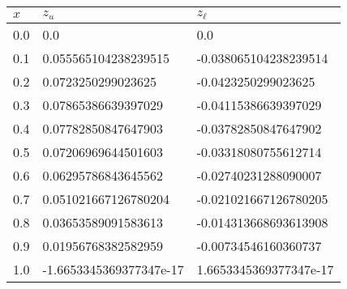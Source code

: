\documentclass{article}%
\begin{document}
\renewcommand{\arraystretch}{1.2}
\begin{tabular}{ l | l | l}
$x$ & $z_u$ & $z_\ell$\\
\hline
0.0 & 0.0 & 0.0 \\
0.1 & 0.055565104238239515 & -0.038065104238239514 \\
0.2 & 0.0723250299023625 & -0.0423250299023625 \\
0.3 & 0.07865386639397029 & -0.04115386639397029 \\
0.4 & 0.07782850847647903 & -0.03782850847647902 \\
0.5 & 0.07206969644501603 & -0.03318080755612714 \\
0.6 & 0.06295786843645562 & -0.02740231288090007 \\
0.7 & 0.051021667126780204 & -0.021021667126780205 \\
0.8 & 0.03653589091583613 & -0.014313668693613908 \\
0.9 & 0.01956768382582959 & -0.00734546160360737 \\
1.0 & -1.6653345369377347e-17 & 1.6653345369377347e-17 \\
\hline
\end{tabular}
\end{document}
